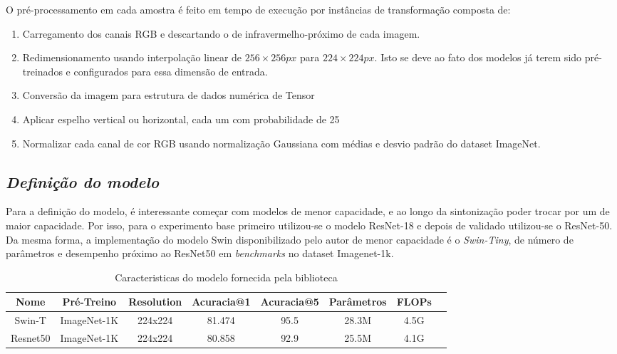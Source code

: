 O pré-processamento em cada amostra é feito em tempo de execução por instâncias de transformação composta de:
\begin{enumerate}
    \item   Carregamento dos canais RGB e descartando o de infravermelho-próximo de cada imagem.
    \item   Redimensionamento usando interpolação linear de $256 \times 256px$ para $224 \times 224px$. Isto se deve ao fato dos modelos já terem sido pré-treinados e configurados para essa dimensão de entrada.
    \item   Conversão da imagem para estrutura de dados numérica de Tensor
    \item   Aplicar espelho vertical ou horizontal, cada um com probabilidade de 25%
    \item   Normalizar cada canal de cor RGB usando normalização Gaussiana com médias e desvio padrão do dataset ImageNet.
\end{enumerate}


\subsection{\textit{Definição do modelo}}\label{sec:Cap3_Def_modelo}


Para a definição do modelo, é interessante começar com modelos de menor capacidade, e ao longo da sintonização poder trocar por um de maior capacidade. Por isso, para o experimento base primeiro utilizou-se o modelo ResNet-18 e depois de validado utilizou-se o ResNet-50. Da mesma forma, a implementação do modelo Swin disponibilizado pelo autor de menor capacidade é o \textit{Swin-Tiny}, de número de parâmetros e desempenho próximo ao ResNet50 em \textit{benchmarks} no dataset Imagenet-1k.

\begin{table}[h!]
    \caption{Caracteristicas do modelo fornecida pela biblioteca } 
    \centering
\begin{tabular}{*{8}{c}}
    \toprule
    Nome & Pré-Treino & Resolution & Acuracia@1 & Acuracia@5 &  Parâmetros & FLOPs \\
    \midrule
    Swin-T & ImageNet-1K & 224x224 & 81.474 & 95.5 &	28.3M &	4.5G \\
    Resnet50 & ImageNet-1K & 224x224 &	80.858 & 92.9 &	25.5M &	4.1G \\
    \bottomrule
\end{tabular}
\label{tab:especificacao_modelos}
\end{table}

